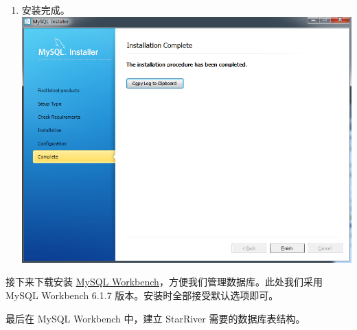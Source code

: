 \begin{enumerate}
\item
  安装完成。 \includegraphics{img/mysql_11.png}
\end{enumerate}

接下来下载安装 \href{http://dev.mysql.com/downloads/workbench/}{MySQL
Workbench}，方便我们管理数据库。此处我们采用 MySQL Workbench 6.1.7
版本。安装时全部接受默认选项即可。

最后在 MySQL Workbench 中，建立 StarRiver 需要的数据库表结构。

